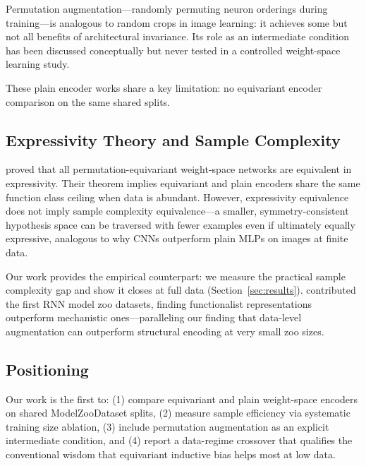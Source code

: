 Permutation augmentation---randomly permuting neuron orderings during training---is analogous to random crops in image learning: it achieves some but not all benefits of architectural invariance. Its role as an intermediate condition has been discussed conceptually but never tested in a controlled weight-space learning study.

These plain encoder works share a key limitation: no equivariant encoder comparison on the same shared splits.

\subsection{Expressivity Theory and Sample Complexity}

\citet{Dayan2026Expressive} proved that all permutation-equivariant weight-space networks are equivalent in expressivity. Their theorem implies equivariant and plain encoders share the same function class ceiling when data is abundant. However, expressivity equivalence does not imply sample complexity equivalence---a smaller, symmetry-consistent hypothesis space can be traversed with fewer examples even if ultimately equally expressive, analogous to why CNNs outperform plain MLPs on images at finite data.

Our work provides the empirical counterpart: we measure the practical sample complexity gap and show it closes at full data (Section~\ref{sec:results}). \citet{Herrmann2024Learning} contributed the first RNN model zoo datasets, finding functionalist representations outperform mechanistic ones---paralleling our finding that data-level augmentation can outperform structural encoding at very small zoo sizes.

\subsection{Positioning}

Our work is the first to: (1) compare equivariant and plain weight-space encoders on shared ModelZooDataset splits, (2) measure sample efficiency via systematic training size ablation, (3) include permutation augmentation as an explicit intermediate condition, and (4) report a data-regime crossover that qualifies the conventional wisdom that equivariant inductive bias helps most at low data.
